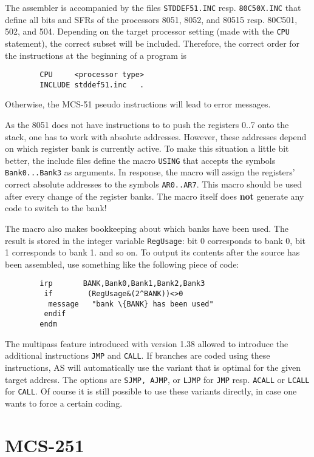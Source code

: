 \documentclass[12pt,twoside]{report}
\newcommand{\bb}[1]{{\bf #1}}
\newcommand{\tty}[1]{{\tt #1}}
\begin{document}
The assembler is accompanied by the files \tty{STDDEF51.INC} resp.
\tty{80C50X.INC} that define all bits and SFRs of the processors 8051,
8052, and 80515 resp. 80C501, 502, and 504.  Depending on the target
processor setting (made with the \tty{CPU} statement), the correct subset
will be included.  Therefore, the correct order for the instructions
at the beginning of a program is
\begin{verbatim}
        CPU     <processor type>
        INCLUDE stddef51.inc   .
\end{verbatim}
Otherwise, the MCS-51 pseudo instructions will lead to error
messages.

As the 8051 does not have instructions to to push the registers 0..7
onto the stack, one has to work with absolute addresses.  However,
these addresses depend on which register bank is currently active. 
To make this situation a little bit better, the include files define
the macro \tty{USING} that accepts the symbols \tty{Bank0...Bank3} as arguments.
In response, the macro will assign the registers' correct absolute
addresses to the symbols \tty{AR0..AR7}.  This macro should be used after
every change of the register banks.  The macro itself does \bb{not}
generate any code to switch to the bank!

The macro also makes bookkeeping about which banks have been used. 
The result is stored in the integer variable \tty{RegUsage}: bit 0
corresponds to bank 0, bit 1 corresponds to bank 1. and so on.  To
output its contents after the source has been assembled, use
something like the following piece of code:
\begin{verbatim}
        irp       BANK,Bank0,Bank1,Bank2,Bank3
         if        (RegUsage&(2^BANK))<>0
          message   "bank \{BANK} has been used"
         endif
        endm
\end{verbatim}
The multipass feature introduced with version 1.38 allowed to introduce
the additional instructions \tty{JMP} and \tty{CALL}.  If branches are
coded using these instructions, AS will automatically use the variant that
is optimal for the given target address.  The options are \tty{SJMP,
AJMP}, or \tty{LJMP} for \tty{JMP} resp. \tty{ACALL} or \tty{LCALL} for
\tty{CALL}.  Of course it is still possible to use these variants
directly, in case one wants to force a certain coding.


\section{MCS-251}
\end{document}
